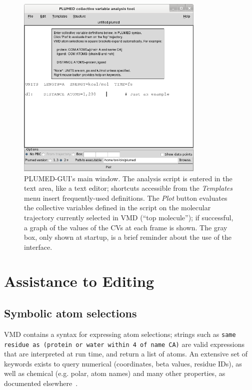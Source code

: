 \documentclass[preprint,12pt]{elsarticle}
\begin{document}
\begin{figure}
  \centering
  \includegraphics[width=0.8\textwidth]{images/main}
  \caption{PLUMED-GUI's main window.  The analysis script is entered
    in the text area, like a text editor; shortcuts accessible from
    the \emph{Templates} menu insert frequently-used definitions. The
    \emph{Plot} button evaluates the collective variables defined in
    the script on the molecular trajectory currently selected in VMD
    (``top molecule''); if successful, a graph of the values of the
    CVs at each frame is shown. The gray box, only shown at startup,
    is a brief reminder about the use of the interface.  }
  \label{fig:main}
\end{figure}





\section{Assistance to Editing}


\subsection{Symbolic atom selections}\label{sec:symb-atom-select}

VMD contains a syntax for expressing atom selections; strings such as
\texttt{same residue as (protein or water within 4 of name CA)} are valid
expressions that are interpreted at run time, and return a list of
atoms.  An extensive set of keywords exists to query numerical
(coordinates, beta values, residue IDs), as well as chemical
(e.g. polar, atom names) and many other properties, as documented
elsewhere~\cite{Humphrey_Dalke_Schulten_1996}.
\end{document}
